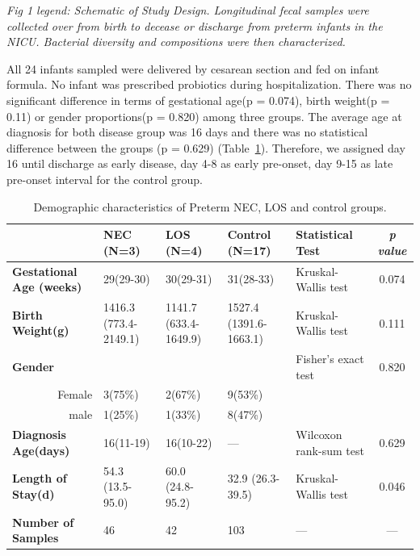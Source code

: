 \documentclass[fleqn,10pt]{wlpeerj} %
\begin{document}
     \emph{Fig 1 legend: Schematic of Study Design. Longitudinal fecal samples were collected over from birth to decease or discharge from preterm infants in the NICU. Bacterial diversity and compositions were then characterized.}

  \noindent
   All 24 infants sampled were delivered by cesarean section and fed on infant formula. No infant was prescribed probiotics during hospitalization. There was no significant difference in terms of gestational age(p = 0.074), birth weight(p = 0.11) or gender proportions(p = 0.820) among three groups. The average age at diagnosis for both disease group was 16 days and there was no statistical difference between the groups (p = 0.629) (Table~\ref{tab:demographic}). Therefore, we assigned day 16 until discharge as early disease, day 4-8 as early pre-onset, day 9-15 as late pre-onset interval for the control group.
    \begin{table}[!hpb]
       \centering
       \caption{\label{tab:demographic}Demographic characteristics of Preterm NEC, LOS and control groups.}
      \begin{tabular}{lp{1.8cm}p{1.8cm}p{1.8cm}p{2cm}c}
        \toprule
          & \textbf{NEC (N=3)} & \textbf{LOS (N=4)} & \textbf{Control (N=17)} & \textbf{Statistical Test} & \textit{p value} \\ \midrule
        \textbf{Gestational Age (weeks)} & 29(29-30) & 30(29-31) & 31(28-33) & Kruskal-Wallis test & 0.074 \\
        \textbf{Birth Weight(g)} & 1416.3 (773.4-2149.1) & 1141.7 (633.4-1649.9) & 1527.4 (1391.6-1663.1) & Kruskal-Wallis test & 0.111 \\
        \textbf{Gender} &  &  &  & Fisher's exact test & 0.820 \\
        \multicolumn{1}{r}{Female} & 3(75\%) & 2(67\%) & 9(53\%) &  & \\
        \multicolumn{1}{r}{male} & 1(25\%) & 1(33\%) & 8(47\%) &  & \\
        \textbf{Diagnosis Age(days)} & 16(11-19) & 16(10-22) & — & Wilcoxon rank-sum test & 0.629 \\
        \textbf{Length of Stay(d)} & 54.3 (13.5-95.0) & 60.0 (24.8-95.2) & 32.9 (26.3-39.5) & Kruskal-Wallis test & 0.046 \\
        \textbf{Number of Samples} & 46 & 42 & 103 & — & — \\ \bottomrule
      \end{tabular}
    \end{table}
\end{document}
